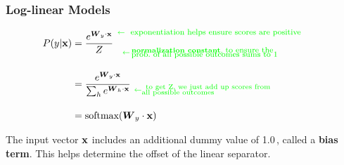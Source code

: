 \documentclass[xcolor=pdftex,x11names,table,hyperref]{beamer}
\begin{document}
\begin{frame}[fragile]\frametitle{Log-linear Models}
	\begin{Large}
	\begin{align}
		P(y | \mathbf{x}) & = \frac{{\mathnormal e}^{\boldsymbol W_y \cdot \mathbf{x}} }{Z} \hspace*{0.4em} \substack{\color{green}{ \leftarrow \, \text{\parbox[c]{0.58\textwidth}{ {\footnotesize \, exponentiation helps ensure scores are positive}}}} \\[1.0em]  \color{green}{ \leftarrow \, \text{\parbox[c]{0.55\textwidth}{ \textbf{normalization constant}, {\footnotesize to ensure the \\[-0.9em] prob.\ of all possible outcomes sums to 1}}}}}  \nonumber\\[1.0em]
							& =	\frac{{\mathnormal e}^{\boldsymbol W_y \cdot \mathbf{x}}}{\sum_h {\mathnormal e}^{\boldsymbol W_h \cdot \mathbf{x}}}  \,\, \substack{ \, \\[1.0em]  \color{green}{ \leftarrow \text{\parbox[c]{0.50\textwidth}{ \, to get Z, we just add up scores from \\[-0.8em] all possible outcomes}}}} \nonumber\\[1.0em]
							& = \text{softmax}(\boldsymbol W_y \cdot \mathbf{x}) \nonumber%
	\end{align}
	\end{Large}
	\pause

	The input vector $\bf x$ includes an additional dummy value of 1.0\,, called a \textbf{bias term}.
	This helps determine the offset of the linear separator.  %
\end{frame}
\end{document}
